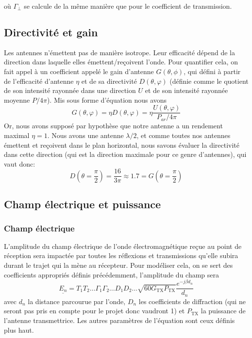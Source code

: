o{\`u} $\Gamma_{\perp}$ se calcule de la m{\^e}me mani{\`e}re que pour le
coefficient de transmission.

\subsection{Directivit{\'e} et gain}

Les antennes n'{\'e}mettent pas de mani{\`e}re isotrope. Leur
efficacit{\'e} d{\'e}pend de la direction dans laquelle elles
{\'e}mettent/re{\c c}oivent l'onde. Pour quantifier cela, on fait appel {\`a}
un coefficient appel{\'e} le gain d'antenne $G (\theta, \phi)$, qui défini
{\`a} partir de l'efficacité d'antenne $\eta$ et de sa directivit{\'e} $D (\theta, \varphi)$ (définie comme le quotient de son intensit{\'e} rayonn{\'e}e
dans une direction $U$ et de son intensit{\'e} rayonn{\'e}e moyenne $P / 4
\pi$). Mis sous forme d'{\'e}quation nous avons
\[ G (\theta, \varphi) = \eta D (\theta, \varphi) = \eta \frac{U (\theta,
   \varphi)}{P_{a r} / 4 \pi} \]
Or, nous avons suppos{\'e} par hypoth{\`e}se que notre antenne a un rendement
maximal $\eta = 1$. Nous avons une antenne $\lambda / 2$, et comme toutes nos
antennes {\'e}mettent et re{\c c}oivent dans le plan horizontal, nous savons
{\'e}valuer la directivit{\'e} dans cette direction (qui est la direction
maximale pour ce genre d'antennes), qui vaut donc:
\[ D (\theta = \frac{\pi}{2}) = \frac{16}{3 \pi} \approx 1.7 = G
   (\theta =  \frac{\pi}{2})\]
   
\subsection{Champ {\'e}lectrique et puissance }

\subsubsection*{Champ électrique}
L'amplitude du champ {\'e}lectrique de l'onde {\'e}lectromagn{\'e}tique re{\c
c}ue au point de r{\'e}ception sera impact{\'e}e par toutes les r{\'e}flexions
et transmissions qu'elle subira durant le trajet qui la m{\`e}ne au
r{\'e}cepteur. Pour mod{\'e}liser cela, on se sert des coefficients
appropri{\'e}s d{\'e}finis pr{\'e}c{\'e}demment, l'amplitude du champ sera
\begin{equation}
\label{eq:elec-field}
    \underline{E_n} = T_1 T_2 \ldots \Gamma_1 \Gamma_2 \ldots D_1 D_2 \ldots \sqrt{60 G_{\mathrm{TX}} P_{\mathrm{TX}}} \frac{e^{- j \beta d_n}}{d_n}
\end{equation}
avec $d_n$ la distance parcourue par l'onde, $D_n$ les coefficients de
diffraction (qui ne seront pas pris en compte pour le projet donc vaudront 1)
et $P_{\mathrm{TX}}$ la puissance de l'antenne transmettrice. Les autres param{\`e}tres de
l'{\'e}quation sont ceux d{\'e}finis plus haut.

